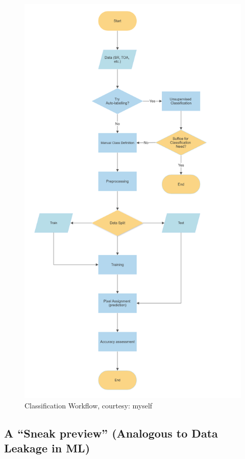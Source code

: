 \documentclass[
  letterpaper,
  DIV=11,
  numbers=noendperiod]{scrreprt}
\begin{document}
\begin{figure}

{\centering \includegraphics{./images/FlowChart.png}

}

\caption{\label{fig-flowchart}Classification Workflow, courtesy: myself}

\end{figure}

\hypertarget{a-sneak-preview-analogous-to-data-leakage-in-ml}{%
\subsection{A ``Sneak preview'' (Analogous to Data Leakage in
ML)}\label{a-sneak-preview-analogous-to-data-leakage-in-ml}}
\end{document}
